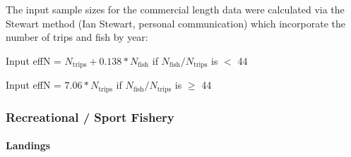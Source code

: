 \documentclass[11pt,
  english,
  a4paper,
]{article}
\begin{document}
\leavevmode\tagmcend\tagstructend\par


The input sample sizes for the commercial length data were calculated via the Stewart method (Ian Stewart, personal communication) which incorporate the number of trips and fish by year:

\leavevmode\tagmcend\tagstructend\par

\begin{centering}

Input effN = $N_{\text{trips}} + 0.138 * N_{\text{fish}}$ if $N_{\text{fish}}/N_{\text{trips}}$ is $<$ 44

Input effN = $7.06 * N_{\text{trips}}$ if $N_{\text{fish}}/N_{\text{trips}}$ is $\geq$ 44

\end{centering}


\hypertarget{recreational-sport-fishery}{%
\subsubsection{Recreational / Sport Fishery}\label{recreational-sport-fishery}}

\leavevmode\tagmcend\tagstructend


\hypertarget{landings-1}{%
\paragraph{Landings}\label{landings-1}}

\leavevmode\tagmcend\tagstructend

\end{document}
